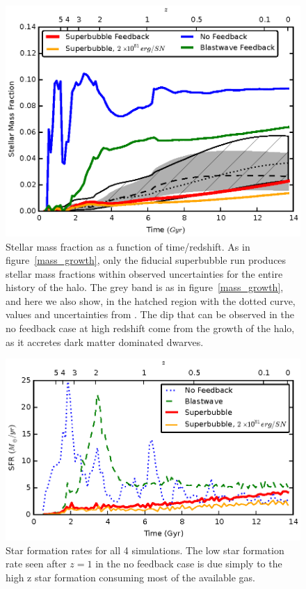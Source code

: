 \begin{figure}
    \includegraphics[width=\textwidth]{figures2/stellar_fraction.eps}
    \caption[Stellar mass fraction evolution]{Stellar mass fraction as a
    function of time/redshift.  As in figure~\ref{mass_growth}, only the
    fiducial superbubble run produces stellar mass fractions within observed
    uncertainties for the entire history of the halo. The grey band is as in
    figure~\ref{mass_growth}, and here we also show, in the hatched region with
    the dotted curve, values and uncertainties from \citet{Moster2013}.  The dip
    that can be observed in the no feedback case at high redshift come from the
    growth of the halo, as it accretes dark matter dominated dwarves.}
    \label{stellar_fraction}
\end{figure}
\begin{figure}
    \includegraphics[width=\textwidth]{figures2/sfr.eps}
    \caption[Star formation rate as a function of feedback model]{Star formation
    rates for all 4 simulations.  The low star formation rate seen after $z=1$
    in the no feedback case is due simply to the high z star formation consuming
    most of the available gas.}
    \label{sfr}
\end{figure}
